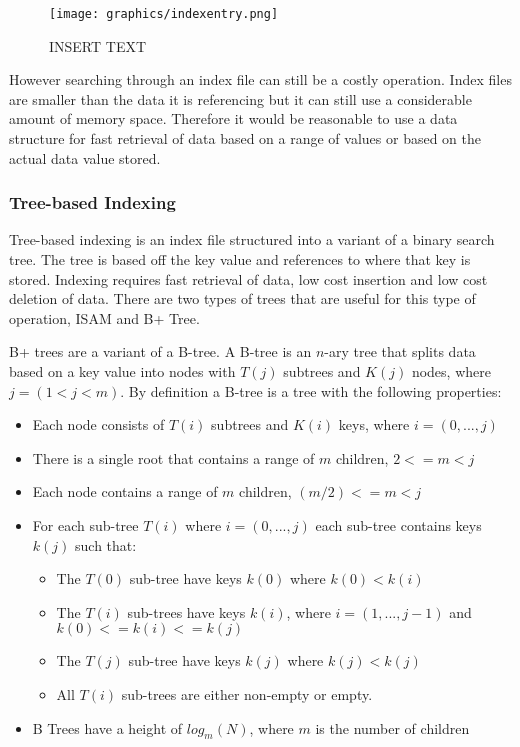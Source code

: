 \documentclass[letterpaper, 12pt]{article}
\begin{document}
\begin{figure}
  \centering
  \texttt{[image: graphics/indexentry.png]}
  \caption{INSERT TEXT}
  \label{fig:index_entry}
\end{figure}

However searching through an index file can still be a costly operation. Index files are smaller than the
data it is referencing but it can still use a considerable amount of memory space. Therefore it would be
reasonable to use a data structure for fast retrieval of data based on a range of values or based on
the actual data value stored.
\par\vspace{\baselineskip}

\subsubsection{Tree-based Indexing}
Tree-based indexing is an index file structured into a variant of a binary search tree. The tree is based off
the key value and references to where that key is stored. Indexing requires fast retrieval of data, low cost
insertion and low cost deletion of data. There are two types of trees that are useful for this type of operation,
ISAM and B+ Tree.
\par\vspace{\baselineskip}

B+ trees are a variant of a B-tree. A B-tree is an $n$-ary tree that splits data
based on a key value into nodes with $T(j)$ subtrees and $K(j)$ nodes, where $j = (1<j<m)$.
By definition a B-tree is a tree with the following properties:
\begin{itemize}
  \item Each node consists of $T(i)$ subtrees and $K(i)$ keys, where $i = (0,...,j)$
  \item There is a single root that contains a range of $m$ children, $2<= m < j$
  \item Each node contains a range of $m$ children, $(m/2) <= m < j$
  \item For each sub-tree $T(i)$ where $i = (0,...,j)$ each sub-tree contains keys $k(j)$ such that:
  \begin{itemize}
    \item The $T(0)$ sub-tree have keys $k(0)$ where $k(0) < k(i)$
    \item The $T(i)$ sub-trees have keys $k(i)$, where $i = (1, ..., j-1)$ and $k(0) <= k(i) <= k(j)$
    \item The $T(j)$ sub-tree have keys $k(j)$ where $k(j) < k(j)$
    \item All $T(i)$ sub-trees are either non-empty or empty.
  \end{itemize}
  \item B Trees have a height of $log_m(N)$, where $m$ is the number of children
\end{itemize}
\end{document}
